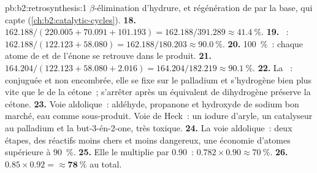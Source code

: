 \begin{solution}{pb:b2:retrosynthesis:1}
$\beta$-élimination d'hydrure, et régénération de  par la base, qui capte 
(\cref{ch:b2:catalytic-cycles}).
\textbf{18.} $162.188/(220.005 + 70.091 + 101.193) = 162.188/391.289 \approx 41.4~\%$.
\textbf{19.} ~: $162.188/(122.123 + 58.080) = 162.188/180.203
\approx 90.0~\%$.
\textbf{20.} 100~\%~: chaque atome de  et de l'énone se retrouve dans le produit.
\textbf{21.} $164.204/(122.123 + 58.080 + 2.016) = 164.204/182.219 \approx 90.1~\%$.
\textbf{22.} La ~: conjuguée et non encombrée, elle se fixe sur le palladium et s'hydrogène bien plus
vite que le  de la cétone~; s'arrêter après un équivalent de dihydrogène préserve la cétone.
\textbf{23.} Voie aldolique~: aldéhyde, propanone et hydroxyde de sodium bon marché, eau comme sous-produit.
Voie de Heck~: un iodure d'aryle, un catalyseur au palladium et la but-3-én-2-one, très toxique.
\textbf{24.} La voie aldolique~: deux étapes, des réactifs moins chers et moins dangereux, une économie
d'atomes supérieure à 90~\%.
\textbf{25.} Elle le multiplie par 0.90~: $0.782 \times 0.90 \approx 70~\%$.
\textbf{26.} $0.85 \times 0.92 = \boldsymbol{\approx 78~\%}$ au total.
\end{solution}

